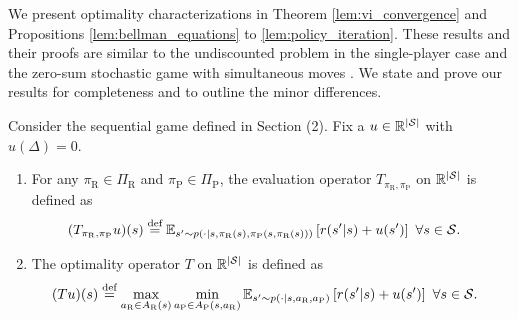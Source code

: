 \documentclass[opre,dblanonrev]{informs4}
\newcommand{\defeq}{\stackrel{\text{def}}{=}}
\newcommand{\abs}[1]{\left\lvert#1\right\rvert}
\begin{document}
\begin{APPENDICES}
        We present optimality characterizations in Theorem \ref{lem:vi_convergence} and Propositions \ref{lem:bellman_equations} to  \ref{lem:policy_iteration}. These results and their proofs are similar to the undiscounted problem in the single-player case \cite[Section 7.2]{bertsekas_dynamic_2012} and the zero-sum stochastic game with simultaneous moves \cite{patek_stochastic_1999}. We state and prove our results for completeness and to outline the minor differences. 
      \begin{definition}\label{defn:sg_operators}
        \normalfont
        Consider the sequential game defined in Section (2). Fix a $u \in \mathbb{R}^{\abs{\cal S}}$ with $u(\Delta) = 0$.
        \begin{enumerate}
            \item For any $\pi_\text{R} \in \Pi_\text{R}$ and $\pi_\text{P} \in \Pi_\text{P}$, the evaluation operator $T_{\pi_\text{R},\pi_{\text{P}}}$ on $\mathbb{R}^{\abs{\cal S}}$ is defined as
            \begingroup
            \allowdisplaybreaks
            \begin{align}
            \label{eqn:eval_operator}
            (T_{\pi_\text{R},\pi_{\text{P}}} u)(s) &\defeq \mathbb{E}_{s' \sim p(\cdot|s,\pi_\text{R}(s),\pi_\text{P}(s,\pi_\text{R}(s)))}\left[r(s'|s) + u(s')\right] \ \forall s \in {\cal S}.
            \end{align}
            \endgroup
            \item The optimality operator $T$ on $\mathbb{R}^{\abs{\cal S}}$ is defined as
            \begingroup
            \allowdisplaybreaks
            \begin{align}
            \label{eqn:bellman_operator}
            (T u)(s) &\defeq \max_{a_\text{R} \in A_\text{R}(s)}\min_{a_\text{P} \in A_\text{P}(s,a_\text{R})}\mathbb{E}_{s' \sim p(\cdot|s,a_\text{R},a_\text{P})}\left[r(s'|s) + u(s')\right] \ \forall s \in {\cal S}.
            \end{align}
            \endgroup
        \end{enumerate}       
       \end{definition}


\end{APPENDICES}
\end{document}
